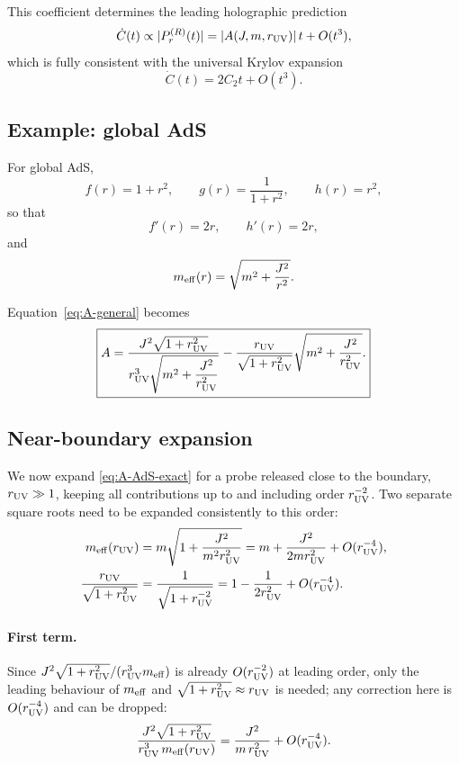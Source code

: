 \documentclass[11pt]{article}
\begin{document}
This coefficient determines the leading holographic prediction
\begin{equation}
\dot C(t)
\propto
|P_r^{(R)}(t)|
=
|A(J,m,r_{\rm UV})|\,t
+
O(t^3),
\end{equation}
which is fully consistent with the universal Krylov expansion
\begin{equation}
\dot C(t)
=
2C_2t
+
O(t^3).
\end{equation}

\subsection{Example: global AdS}

For global AdS,
\begin{equation}
f(r)=1+r^2,
\qquad
g(r)=\frac{1}{1+r^2},
\qquad
h(r)=r^2,
\end{equation}
so that
\begin{equation}
f'(r)=2r,
\qquad
h'(r)=2r,
\end{equation}
and
\begin{equation}
m_{\rm eff}(r)
=
\sqrt{
m^2+\frac{J^2}{r^2}
}.
\end{equation}

Equation~\eqref{eq:A-general} becomes
\begin{equation}
\boxed{
A
=
\frac{
J^2
\sqrt{1+r_{\rm UV}^2}
}
{
r_{\rm UV}^3
\sqrt{
m^2+\dfrac{J^2}{r_{\rm UV}^2}
}
}
-
\frac{
r_{\rm UV}
}
{
\sqrt{1+r_{\rm UV}^2}
}
\sqrt{
m^2+\frac{J^2}{r_{\rm UV}^2}
}.
}
\label{eq:A-AdS-exact}
\end{equation}

\subsection{Near-boundary expansion}

We now expand \eqref{eq:A-AdS-exact} for a probe released close to the boundary, $r_{\rm UV}\gg1$, keeping all contributions up to and including order $r_{\rm UV}^{-2}$. Two separate square roots need to be expanded consistently to this order:
\begin{align}
m_{\rm eff}(r_{\rm UV})
&=
m\sqrt{1+\frac{J^2}{m^2r_{\rm UV}^2}}
=
m
+
\frac{J^2}{2mr_{\rm UV}^2}
+
O(r_{\rm UV}^{-4}),
\\
\frac{r_{\rm UV}}{\sqrt{1+r_{\rm UV}^2}}
&=
\frac{1}{\sqrt{1+r_{\rm UV}^{-2}}}
=
1
-
\frac{1}{2r_{\rm UV}^2}
+
O(r_{\rm UV}^{-4}).
\end{align}

\paragraph{First term.} Since $J^2\sqrt{1+r_{\rm UV}^2}/(r_{\rm UV}^3 m_{\rm eff})$ is already $O(r_{\rm UV}^{-2})$ at leading order, only the leading behaviour of $m_{\rm eff}$ and $\sqrt{1+r_{\rm UV}^2}\approx r_{\rm UV}$ is needed; any correction here is $O(r_{\rm UV}^{-4})$ and can be dropped:
\begin{equation}
\frac{J^2\sqrt{1+r_{\rm UV}^2}}{r_{\rm UV}^3\,m_{\rm eff}(r_{\rm UV})}
=
\frac{J^2}{m\,r_{\rm UV}^2}
+
O(r_{\rm UV}^{-4}).
\end{equation}
\end{document}

